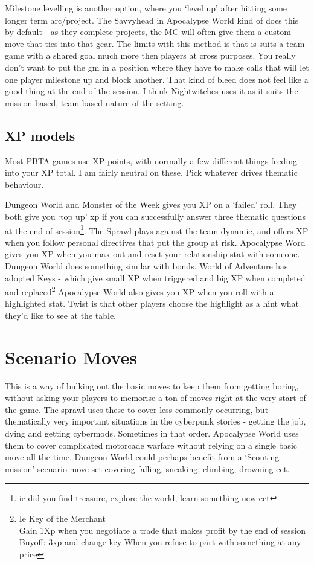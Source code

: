 \documentclass{tufte-handout}
\begin{document}
Milestone levelling is another option, where you `level up' after hitting some longer term arc/project. The Savvyhead in Apocalypse World kind of does this by default - as they complete projects, the MC will often give them a custom move that ties into that gear. The limits with this method is that is suits a team game with a shared goal much more then players at cross purposes. You really don't want to put the gm in a position where they have to make calls that will let one player milestone up and block another. That kind of bleed does not feel like a good thing at the end of the session.  I think Nightwitches uses it as it suits the mission based, team based nature of the setting.

\subsection{XP models}
Most PBTA games use XP points, with normally a few different things feeding into your XP total. I am fairly neutral on these. Pick whatever drives thematic behaviour.

Dungeon World and Monster of the Week gives you XP on a `failed' roll.
They both give you `top up' xp if you can successfully answer three thematic questions at the end of session\footnote{ie did you find treasure, explore the world, learn something new ect}.
The Sprawl plays against the team dynamic, and offers XP when you follow personal directives that put the group at risk.
Apocalypse Word gives you XP when you max out and reset your relationship stat with someone. Dungeon World does something similar with bonds. 
World of Adventure has adopted Keys - which give small XP when triggered and big XP when completed and replaced\footnote{Ie Key of the Merchant \\ Gain 1Xp when you negotiate a trade that makes profit by the end of session \\ Buyoff: 3xp and change key When you refuse to part with something at any price}
Apocalypse World also gives you XP when you roll with a highlighted stat. Twist is that other players choose the highlight as a hint what they'd like to see at the table. 

\section{Scenario Moves}
This is a way of bulking out the basic moves to keep them from getting boring, without asking your players to memorise a ton of moves right at the very start of the game.
The sprawl uses these to cover less commonly occurring, but thematically very important situations in the cyberpunk stories - getting the job, dying and getting cybermods. Sometimes in that order.
Apocalypse World uses them to cover complicated motorcade warfare without relying on a single basic move all the time. 
Dungeon World could perhaps benefit from a `Scouting mission' scenario move set covering falling, sneaking, climbing, drowning ect.
\end{document}
